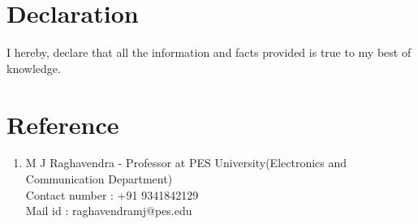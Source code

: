 \documentclass{article}
\begin{document}
	\section{Declaration}
	I hereby, declare that all the information and facts provided is true to my best of knowledge.
	
	\section{Reference}
	\begin{enumerate}
		\item M J Raghavendra - Professor at PES University(Electronics and Communication Department)
		\\Contact number : +91 9341842129
		\\Mail id : raghavendramj@pes.edu	
	\end{enumerate}
\end{document}
